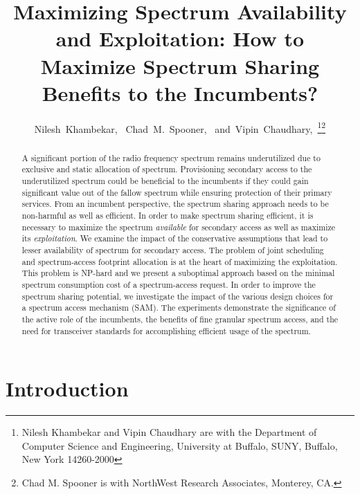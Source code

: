 \documentclass[12pt, draftclsnofoot, onecolumn]{IEEEtran}
\begin{document}
\title{Maximizing Spectrum Availability and Exploitation: How to Maximize Spectrum Sharing Benefits to the Incumbents?}

\author{Nilesh~Khambekar,~
        Chad~M.~Spooner,~
        and~Vipin~Chaudhary,~\thanks{Nilesh Khambekar and Vipin Chaudhary are with the Department of Computer Science and Engineering, University at Buffalo, SUNY, Buffalo, New York 14260-2000}\thanks{Chad M. Spooner is with NorthWest Research Associates, Monterey, CA.}}

\maketitle

\begin{abstract}
A significant portion of the radio frequency spectrum remains underutilized due to exclusive and static allocation of spectrum. Provisioning secondary access to the underutilized spectrum could be beneficial to the incumbents if they could gain significant value out of the fallow spectrum while ensuring protection of their primary services. From an incumbent perspective, the spectrum sharing approach needs to be non-harmful as well as efficient. In order to make spectrum sharing efficient, it is necessary to maximize the spectrum \textit{available} for secondary access as well as maximize its \textit{exploitation}. We examine the impact of the conservative assumptions that lead to lesser availability of spectrum for secondary access. The problem of joint scheduling and spectrum-access footprint allocation is at the heart of maximizing the exploitation. This problem is NP-hard and we present a suboptimal approach based on the minimal spectrum consumption cost of a spectrum-access request. In order to improve the spectrum sharing potential, we investigate the impact of the various design choices for a spectrum access mechanism (SAM). The experiments demonstrate the significance of the active role of the incumbents, the benefits of fine granular spectrum access, and the need for transceiver standards for accomplishing efficient usage of the spectrum.
\end{abstract}


\section{Introduction}
\end{document}
